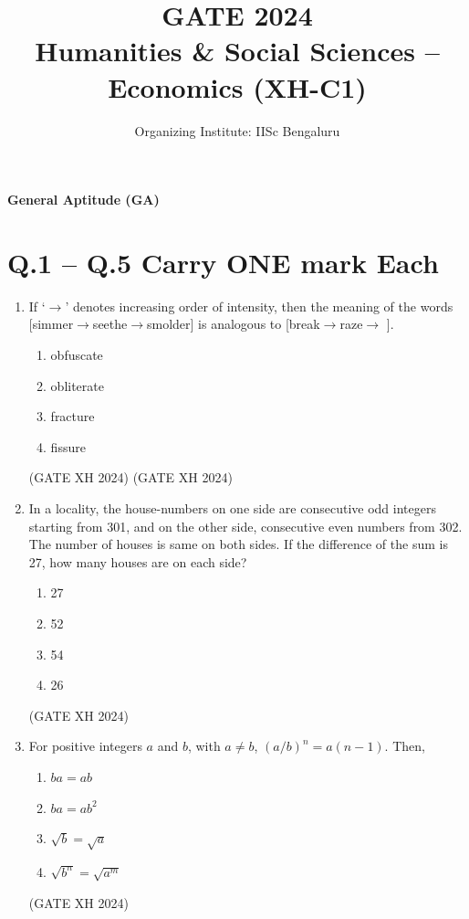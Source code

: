 \documentclass{article}
\title{\textbf{GATE 2024\\Humanities \& Social Sciences – Economics (XH-C1)}}
\author{Organizing Institute: IISc Bengaluru}
\date{}
\begin{document}
\maketitle
\noindent \textbf{General Aptitude (GA)}

\section*{Q.1 – Q.5 Carry ONE mark Each}
\begin{enumerate}
    \item If ‘$\rightarrow$’ denotes increasing order of intensity, then the meaning of the words [simmer$\rightarrow$seethe$\rightarrow$smolder] is analogous to [break$\rightarrow$raze$\rightarrow$ \makebox[1cm]{\hrulefill}]. 
    
    \begin{multicols}{4}
        \begin{enumerate}
            \item obfuscate
            \item obliterate
            \item fracture
            \item fissure
        \end{enumerate} 
    \end{multicols} \hfill (GATE XH 2024) \hfill (GATE XH 2024)

    \item In a locality, the house-numbers on one side are consecutive odd integers starting from 301, and on the other side, consecutive even numbers from 302. The number of houses is same on both sides. If the difference of the sum is 27, how many houses are on each side?

    \begin{multicols}{4}
        \begin{enumerate}
            \item 27
            \item 52
            \item 54
            \item 26
        \end{enumerate}
    \end{multicols} \hfill (GATE XH 2024)
   
    \item For positive integers $a$ and $b$, with $a \neq b$, $(a/b)^n = a(n-1)$. Then,

    \begin{multicols}{4}
        \begin{enumerate}
            \item $ba = ab$
            \item $ba = ab^2$
            \item $\sqrt{b} = \sqrt{a}$
            \item $\sqrt{b^n} = \sqrt{a^m}$
        \end{enumerate}
    \end{multicols} \hfill (GATE XH 2024)


\end{enumerate}
\end{document}
